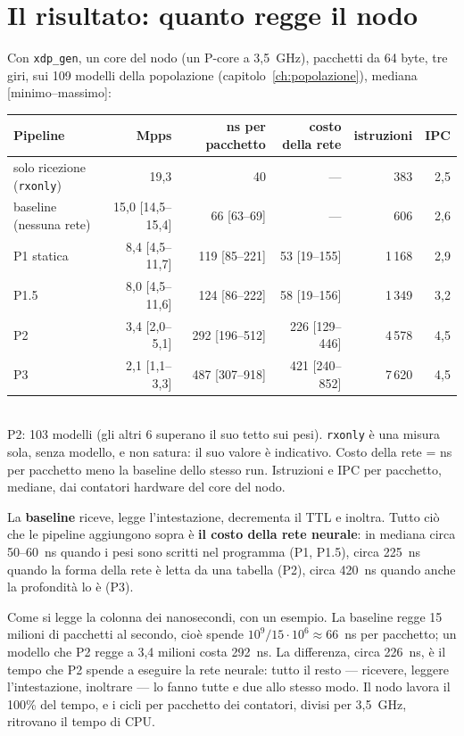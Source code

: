 \documentclass[11pt,a4paper,oneside]{report}
\begin{document}
\section{Il risultato: quanto regge il nodo}

Con \texttt{xdp\_gen}, un core del nodo (un P-core a 3,5~GHz), pacchetti da 64
byte, tre giri, sui 109 modelli della popolazione
(capitolo~\ref{ch:popolazione}), mediana [minimo--massimo]:

\begin{center}
\small
\begin{tabular}{@{}lrrrrr@{}}
\toprule
\textbf{Pipeline} & \textbf{Mpps} & \textbf{ns per pacchetto} & \textbf{costo della rete}
& \textbf{istruzioni} & \textbf{IPC} \\
\midrule
solo ricezione (\texttt{rxonly}) & 19,3 & 40 & --- & 383 & 2,5 \\
baseline (nessuna rete) & 15,0 [14,5--15,4] & 66 [63--69] & --- & 606 & 2,6 \\
P1 statica  & 8,4 [4,5--11,7] & 119 [85--221] & 53 [19--155] & 1\,168 & 2,9 \\
P1.5        & 8,0 [4,5--11,6] & 124 [86--222] & 58 [19--156] & 1\,349 & 3,2 \\
P2          & 3,4 [2,0--5,1]  & 292 [196--512] & 226 [129--446] & 4\,578 & 4,5 \\
P3          & 2,1 [1,1--3,3]  & 487 [307--918] & 421 [240--852] & 7\,620 & 4,5 \\
\bottomrule
\end{tabular}\\[2pt]
{\footnotesize\color{soft} P2: 103 modelli (gli altri 6 superano il suo tetto sui
pesi). \texttt{rxonly} è una misura sola, senza modello, e non satura: il suo
valore è indicativo. Costo della rete = ns per pacchetto meno la baseline dello
stesso run. Istruzioni e IPC per pacchetto, mediane, dai contatori hardware del
core del nodo.}
\end{center}

\begin{lezione}
La \textbf{baseline} riceve, legge l'intestazione, decrementa il TTL e inoltra.
Tutto ciò che le pipeline aggiungono sopra è \textbf{il costo della rete
neurale}: in mediana circa 50--60~ns quando i pesi sono scritti nel programma
(P1, P1.5), circa 225~ns quando la forma della rete è letta da una tabella (P2),
circa 420~ns quando anche la profondità lo è (P3).
\end{lezione}

Come si legge la colonna dei nanosecondi, con un esempio. La baseline regge
15 milioni di pacchetti al secondo, cioè spende $10^9 / 15 \cdot 10^6 \approx
66$~ns per pacchetto; un modello che P2 regge a 3,4 milioni costa 292~ns. La
differenza, circa 226~ns, è il tempo che P2 spende a eseguire la rete neurale:
tutto il resto --- ricevere, leggere l'intestazione, inoltrare --- lo fanno tutte
e due allo stesso modo. Il nodo lavora il 100\% del tempo, e i cicli per
pacchetto dei contatori, divisi per 3,5~GHz, ritrovano il tempo di CPU.
\end{document}
